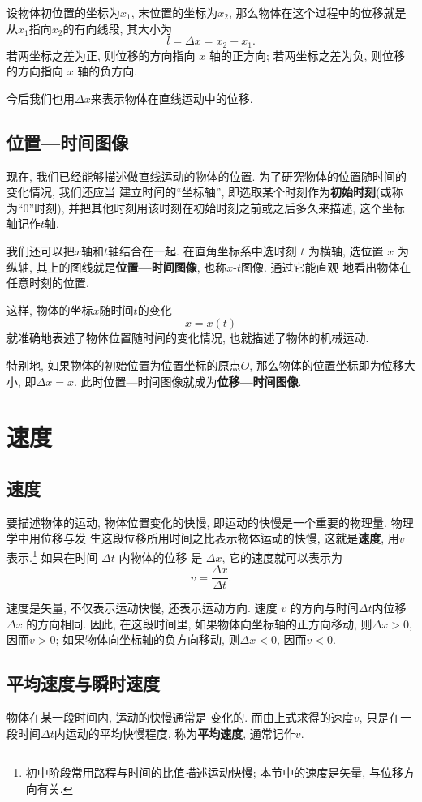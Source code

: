 \documentclass[11pt,a4paper]{ctexbook}
\begin{document}
设物体初位置的坐标为$x_1$, 末位置的坐标为$x_2$, 那么物体在这个过程中的位移就是从$x_1$指向$x_2$的有向线段, 其大小为
$$l = \Delta x = x_2-x_1.$$
若两坐标之差为正, 则位移的方向指向 $x$ 轴的正方向;
若两坐标之差为负, 则位移的方向指向 $x$ 轴的负方向.

今后我们也用$\Delta x$来表示物体在直线运动中的位移.

\subsection{位置—时间图像}

现在, 我们已经能够描述做直线运动的物体的位置. 为了研究物体的位置随时间的变化情况, 我们还应当
建立时间的``坐标轴'', 即选取某个时刻作为\textbf{初始时刻}(或称为``0''时刻),
并把其他时刻用该时刻在初始时刻之前或之后多久来描述, 这个坐标轴记作$t$轴.

我们还可以把$x$轴和$t$轴结合在一起. 在直角坐标系中选时刻 $t$ 为横轴, 选位置
$x$ 为纵轴, 其上的图线就是\textbf{位置—时间图像}, 也称$x$-$t$图像. 通过它能直观
地看出物体在任意时刻的位置.

这样, 物体的坐标$x$随时间$t$的变化$$x = x(t)$$就准确地表述了物体位置随时间的变化情况,
也就描述了物体的机械运动.

特别地, 如果物体的初始位置为位置坐标的原点$O$, 那么物体的位置坐标即为位移大小, 即$\Delta x = x$.
此时位置—时间图像就成为\textbf{位移—时间图像}.

\section{速度}
\label{速度节}

\subsection{速度}

要描述物体的运动, 物体位置变化的快慢, 即运动的快慢是一个重要的物理量. 物理学中用位移与发
生这段位移所用时间之比表示物体运动的快慢, 这就是\textbf{速度}, 用$v$表示.\footnote{初中阶段常用路程与时间的比值描述运动快慢; 本节中的速度是矢量, 与位移方向有关.}
如果在时间 $\Delta t$ 内物体的位移
是 $\Delta x$, 它的速度就可以表示为$$v = \frac{\Delta x}{\Delta t}.$$

速度是矢量, 不仅表示运动快慢, 还表示运动方向. 速度 $v$ 的方向与时间$\Delta t$内位移 $\Delta x$ 的方向相同. 因此,
在这段时间里, 如果物体向坐标轴的正方向移动, 则$\Delta x>0$, 因而$v>0$;
如果物体向坐标轴的负方向移动, 则$\Delta x<0$, 因而$v<0$.


\subsection{平均速度与瞬时速度}
物体在某一段时间内, 运动的快慢通常是
变化的. 而由上式求得的速度$v$, 只是在一段时间$\Delta t$内运动的平均快慢程度,
称为\textbf{平均速度}, 通常记作$\overline{v}$.
\end{document}
